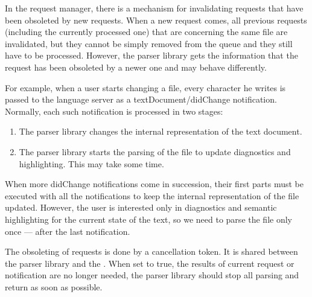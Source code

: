 In the request manager, there is a mechanism for invalidating requests that have been obsoleted by new requests. When a new request comes, all previous requests (including the currently processed one) that are concerning the same file are invalidated, but they cannot be simply removed from the queue and they still have to be processed. However, the parser library gets the information that the request has been obsoleted by a newer one and may behave differently.

For example, when a user starts changing a file, every character he writes is passed to the language server as a textDocument/didChange notification. Normally, each such notification is processed in two stages:
\begin{enumerate}
	\item The parser library changes the internal representation of the text document.
	\item The parser library starts the parsing of the file to update diagnostics and highlighting. This may take some time.
\end{enumerate}
When more didChange notifications come in succession, their first parts must be executed with all the notifications to keep the internal representation of the file updated. However, the user is interested only in diagnostics and semantic highlighting for the current state of the text, so we need to parse the file only once --- after the last notification.

The obsoleting of requests is done by a cancellation token. It is shared between the parser library and the . When set to true, the results of current request or notification are no longer needed, the parser library should stop all parsing and return as soon as possible.


